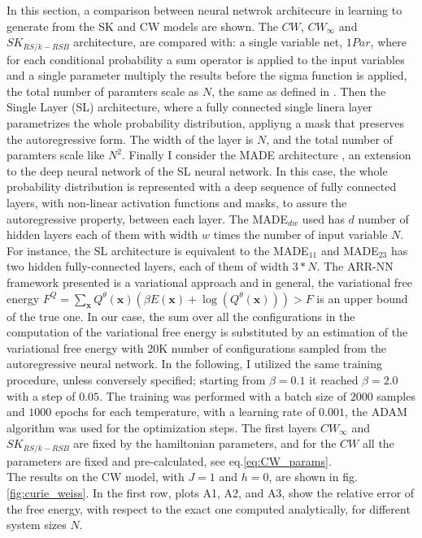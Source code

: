 \documentclass[aps,physrev,10pt,floatfix,reprint]{revtex4-2}
\begin{document}
In this section, a comparison between neural netwrok architecure in learning to generate from the SK and CW models are shown. 
The $CW$, $CW_{\infty}$ and $SK_{RS/k-RSB}$ architecture, are compared with: a single variable net, $1Par$, where for each conditional probability a sum operator is applied to the input variables and a single parameter multiply the results before the sigma function is applied, the total number of paramters scale as $N$, the same as defined in \cite{https://doi.org/10.48550/arxiv.2210.11145}. Then the Single Layer (SL) architecture, where a fully connected single linera layer parametrizes the whole probability distribution, appliyng a mask that preserves the autoregressive form. The width of the layer is $N$, and the total number of paramters scale like $N^2$. Finally I consider the MADE architecture \cite{pmlr-v37-germain15}, an extension to the deep neural network of the SL neural network. In this case, the whole probability distribution is represented with a deep sequence of fully connected layers, with non-linear activation functions and masks, to assure the autoregressive property, between each layer. The MADE$_{dw}$ used has $d$ number of hidden layers each of them with width $w$ times the number of input variable $N$. For instance, the SL architecture is equivalent to the MADE$_{11}$ and MADE$_{23}$ has two hidden fully-connected layers, each of them of width $3*N$. 
The ARR-NN framework presented is a variational approach and in general, the variational free energy $F^{Q} =  \sum_{\mathbf{x}} Q^{\theta}(\mathbf{x})(\beta E(\mathbf{x}) + \log(Q^{\theta}(\mathbf{x}))) > F$ is an upper bound of the true one. In our case, the sum over all the configurations in the computation of the variational free energy is substituted by an estimation of the variational free energy with 20K number of configurations sampled from the autoregressive neural network.
In the following, I utilized the same training procedure, unless conversely specified; starting from $\beta=0.1$ it reached $\beta=2.0$ with a step of $0.05$. The training was performed with a batch size of $2000$ samples and $1000$ epochs for each temperature, with a learning rate of $0.001$, the ADAM algorithm was used for the optimization steps. 
The first layers $CW_{\infty}$ and $SK_{RS/k-RSB}$ are fixed by the hamiltonian parameters, and for the $CW$ all the parameters are fixed and pre-calculated, see eq.\ref{eq:CW_params}.\\
The results on the CW model, with $J=1$ and $h=0$, are shown in fig.\ref{fig:curie_weiss}. 
In the first row, plots A1, A2, and A3, show the relative error of the free energy, with respect to the exact one computed analytically, for different system sizes $N$. 
\end{document}
